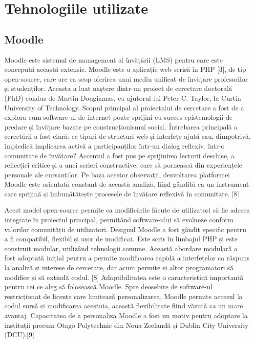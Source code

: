\section{Tehnologiile utilizate}

\subsection{Moodle}

Moodle este sistemul de management al învățării (LMS) pentru care este concepută această extensie. Moodle este o aplicație web scrisă în PHP [3], de tip open-source, care are ca scop 
oferirea unui mediu unificat de învățare profesorilor și studenților. Aceasta a luat naștere dintr-un proiect de cercetare doctorală (PhD) condus de Martin Dougiamas, cu ajutorul lui 
Peter C. Taylor, la Curtin University of Technology. Scopul principal al proiectului de cercetare a fost de a explora cum software-ul de internet poate sprijini cu succes epistemologii 
de predare și învățare bazate pe construcționismul social. Întrebarea principală a cercetării a fost clară: ce tipuri de structuri web și interfețe ajută sau, dimpotrivă, împiedică 
implicarea activă a participanților într-un dialog reflexiv, într-o comunitate de învățare? Accentul a fost pus pe sprijinirea lecturii deschise, a reflecției critice și a unei scrieri 
constructive, care să pornească din experiențele personale ale cursanților. Pe baza acestor observații, dezvoltarea platformei Moodle este orientată constant de această analiză, 
fiind gândită ca un instrument care sprijină și îmbunătățește procesele de învățare reflexivă în comunitate. [8]

Acest model open-source permite ca modificările făcute de utilizatori să fie adesea integrate în proiectul principal, permițând 
software-ului să evolueze conform valorilor comunității de utilizatori. Designul Moodle a fost gândit specific pentru a fi compatibil, flexibil și ușor de modificat. 
Este scris în limbajul PHP și este construit modular, utilizând tehnologii comune. Această abordare modulară a fost adoptată inițial pentru a permite modificarea 
rapidă a interfețelor ca răspuns la analiză și interese de cercetare, dar acum permite și altor programatori să modifice și să extindă codul. [8] Adaptibilitatea este o caracteristică
importantă pentru cei ce aleg să folosească Moodle. Spre deosebire de software-ul restricționat de licențe care limitează personalizarea, Moodle permite accesul la codul sursă și 
modificarea acestuia, această flexibilitate fiind văzută ca un mare avantaj. Capacitatea de a personaliza Moodle a fost un motiv pentru adoptare la instituții precum Otago Polytechnic 
din Noua Zeelandă și  Dublin City University (DCU).[9]

